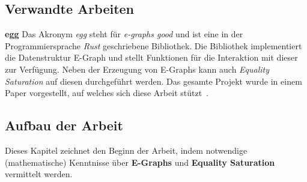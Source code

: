 \subsection{Verwandte Arbeiten}

\noindent\textbf{egg} Das Akronym \textit{egg} steht für \textit{e-graphs good} und ist eine in der Programmiersprache \textit{Rust} geschriebene Bibliothek.
Die Bibliothek implementiert die Datenstruktur E-Graph und stellt Funktionen für die Interaktion mit dieser zur Verfügung.
Neben der Erzeugung von E-Graphs kann auch \textit{Equality Saturation} auf diesen durchgeführt werden.
Das gesamte Projekt wurde in einem Paper vorgestellt, auf welches sich diese Arbeit stützt~\cite{2021-egg}.

\subsection{Aufbau der Arbeit}


Dieses Kapitel zeichnet den Beginn der Arbeit, indem notwendige (mathematische) Kenntnisse über \textbf{E-Graphs} und \textbf{Equality Saturation} vermittelt werden.




